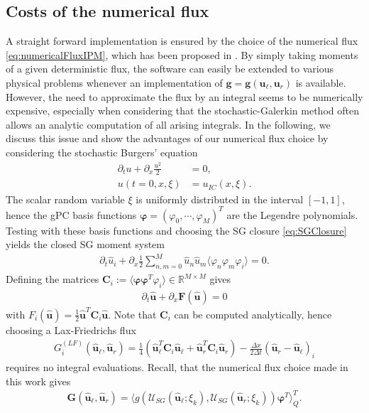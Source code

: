 \subsection{Costs of the numerical flux}
A straight forward implementation is ensured by the choice of the numerical flux \eqref{eq:numericalFluxIPM}, which has been proposed in \cite{kusch2017maximum}. By simply taking moments of a given deterministic flux, the software can easily be extended to various physical problems whenever an implementation of $\bm g = \bm g(\bm u_\ell, \bm u_r)$ is available. However, the need to approximate the flux by an integral seems to be numerically expensive, especially when considering that the stochastic-Galerkin method often allows an analytic computation of all arising integrals. In the following, we discuss this issue and show the advantages of our numerical flux choice by considering the stochastic Burgers' equation
\begin{align*}
\partial_t u + \partial_x \frac{u^2}{2} &= 0,\\
u(t=0,x,\xi) &= u_{IC}(x,\xi).
\end{align*}
The scalar random variable $\xi$ is uniformly distributed in the interval $[-1,1]$, hence the gPC basis functions $\bm\varphi=(\varphi_0,\cdots,\varphi_M)^T$ are the Legendre polynomials. Testing with these basis functions and choosing the SG closure \eqref{eq:SGClosure} yields the closed SG moment system
\begin{align*}
\partial_t \hat u_i + \partial_x \frac12\sum_{n,m = 0}^M \hat u_n \hat u_m \langle \varphi_n\varphi_m\varphi_i \rangle = 0.
\end{align*}
Defining the matrices $\bm C_i := \langle \bm\varphi\bm\varphi^T\varphi_i\rangle\in\mathbb{R}^{M\times M}$ gives
\begin{align*}
\partial_t \bm{\hat u} + \partial_x \bm F(\bm{\hat u}) = 0
\end{align*}
with $F_i(\bm{\hat u}) = \frac12\bm{\hat u}^T\bm C_i\bm{\hat u}$. Note that $\bm{C}_i$ can be computed analytically, hence choosing a Lax-Friedrichs flux
\begin{align}\label{eq:numFluxAnalytic}
G_i^{(LF)}(\bm{\hat u}_{\ell},\bm{\hat u}_{r}) =\frac{1}{4}\left(\bm{\hat u}_{\ell}^T \bm{C}_i \bm{\hat u}_{\ell}+\bm{\hat u}_{r}^T \bm{C}_i \bm{\hat u}_{r}\right) - \frac{\Delta x}{2\Delta t}(\bm{\hat u}_{r}-\bm{\hat u}_{\ell})_i
\end{align}
requires no integral evaluations. Recall, that the numerical flux choice made in this work gives
\begin{align}\label{eq:numericalFluxIPMBurgers}
 \bm{G}(\bm{\hat u}_{\ell},\bm{\hat u}_{r}) = \langle g(\mathcal{U}_{SG}(\bm{\hat u}_{\ell};\xi_k),\mathcal{U}_{SG}(\bm{\hat u}_{r};\xi_k))\bm{\varphi}^T\rangle^T_Q.
\end{align}
